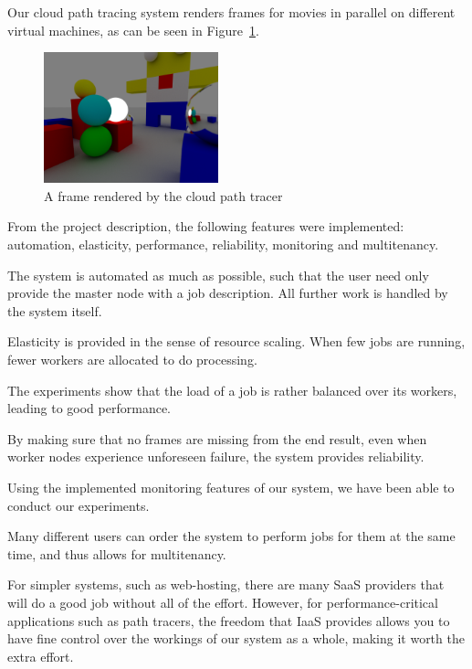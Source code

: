 Our cloud path tracing system renders frames for movies in parallel on different virtual machines, as can be seen in Figure~\ref{fig:frame}.

\begin{figure}[ht!]
    \center
    \includegraphics[width=0.45\textwidth]{./img/frame.png}
    \caption{A frame rendered by the cloud path tracer}
    \label{fig:frame}
\end{figure}

From the project description\cite{projectdescription}, the following features were implemented: automation, elasticity, performance, reliability, monitoring and multitenancy.

The system is automated as much as possible, such that the user need only provide the master node with a job description.
All further work is handled by the system itself.

Elasticity is provided in the sense of resource scaling.
When few jobs are running, fewer workers are allocated to do processing.

The experiments show that the load of a job is rather balanced over its workers, leading to good performance.

By making sure that no frames are missing from the end result, even when worker nodes experience unforeseen failure, the system provides reliability.

Using the implemented monitoring features of our system, we have been able to conduct our experiments.

Many different users can order the system to perform jobs for them at the same time, and thus allows for multitenancy.

For simpler systems, such as web-hosting, there are many SaaS providers that will do a good job without all of the effort.
However, for performance-critical applications such as path tracers, the freedom that IaaS provides allows you to have fine control over the workings of our system as a whole, making it worth the extra effort.